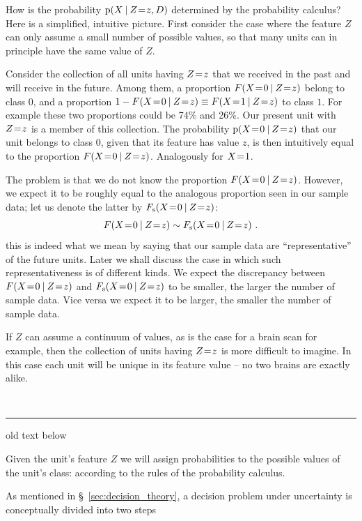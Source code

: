 \documentclass[\ifafour a4paper,12pt,\else a5paper,10pt,\fi%
onecolumn,oneside,article,%
british%
]{memoir}
\theoremstyle{remark}
\theoremstyle{innote}
\newcommand*{\p}{\mathrm{p}}%
\renewcommand*{\|}[1][]{\nonscript\:#1\vert\nonscript\:\mathopen{}}
\newcommand*{\mo}[1][=]{\mathrel{\mkern-3.5mu#1\mkern-3.5mu}}
\newcommand*{\sect}{\S}%
\newcommand*{\wrench}{{\fontencoding{U}\fontfamily{fontawesomethree}\selectfont\symbol{114}}}
\newcommand{\mynotew}[1]{{\footnotesize\color{notecolour}\wrench\ #1}}
\newcommand*{\Fs}{F_{\textrm{s}}}
\begin{document}
\medskip

How is the probability $\p(X \| Z\mo z, D)$ determined by the probability calculus? Here is a simplified, intuitive picture. First consider the case where the feature $Z$ can only assume a small number of possible values, so that many units can in principle have the same value of $Z$.

Consider the collection of all units having $Z\mo z$ that we received in the past and will receive in the future. Among them, a proportion $F(X\mo 0 \| Z\mo z)$ belong to class $0$, and a proportion $1 - F(X\mo 0 \| Z\mo z) \equiv F(X\mo 1 \| Z\mo z)$ to class $1$. For example these two proportions could be 74\% and 26\%. Our present unit with $Z\mo z$ is a member of this collection. The probability $\p(X\mo 0 \| Z\mo z)$ that our unit belongs to class $0$, given that its feature has value $z$, is then intuitively equal to the proportion $F(X\mo 0 \| Z\mo z)$. Analogously for $X\mo 1$.

The problem is that we do not know the proportion $F(X\mo 0 \| Z\mo z)$. However, we expect it to be roughly equal to the analogous proportion seen in our sample data; let us denote the latter by $\Fs(X\mo 0 \| Z\mo z)$:
\begin{equation}
  \label{eq:approx_repres}
  F(X\mo 0 \| Z\mo z) \sim \Fs(X\mo 0 \| Z\mo z) \ .
\end{equation}
this is indeed what we mean by saying that our sample data are \enquote{representative} of the future units. Later we shall discuss the case in which such representativeness is of different kinds. We expect the discrepancy between $F(X\mo 0 \| Z\mo z)$ and $\Fs(X\mo 0 \| Z\mo z)$ to be smaller, the larger the number of sample data. Vice versa we expect it to be larger, the smaller the number of sample data.

If $Z$ can assume a continuum of values, as is the case for a brain scan for example, then the collection of units having $Z\mo z$ is more difficult to imagine. In this case each unit will be unique in its feature value -- no two brains are exactly alike.




\mynotew{\medskip\hrule old text below}

Given the unit's feature $Z$ we will assign probabilities to the possible values of the unit's class:  according to the rules of the probability calculus.

As mentioned in \sect~\ref{sec:decision_theory}, a decision problem under uncertainty is conceptually divided into two steps 
\end{document}
